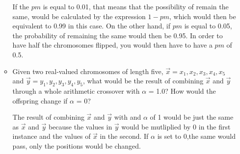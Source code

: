 \documentclass{article}
\begin{document}
\begin{enumerate}
\begin{itemize}
        If the $pm$ is equal to 0.01, that means that the possibility of remain the same, would be calculated by the expression $1 - pm$, which would then be equivalent to 0.99 in this case. On the other hand, if $pm$ is equal to 0.05, the probability of remaining the same would then be 0.95. In order to have half the chromosomes flipped, you would then have to have a $pm$ of 0.5.

        \item Given two real-valued chromosomes of length five, $\vec{x} = {x_1, x_2, x_3, x_4, x_5}$ and $\vec{y} = {y_1, y_2, y_3, y_4, y_5}$, what would be the result of combining $\vec{x}$ and $\vec{y}$ through a whole arithmetic crossover with $\alpha$ = 1.0? How would the offspring change if $\alpha$ = 0?

        The result of combining $\vec{x}$ and $\vec{y}$ with and $\alpha$ of 1 would be just the same as $\vec{x}$ and $\vec{y}$ because the values in $\vec{y}$ would be mutliplied by 0 in the first instance and the values of $\vec{x}$ in the second. If $\alpha$ is set to 0,the same would pass, only the positions would be changed.

    \end{itemize}

\end{enumerate}
\end{document}
